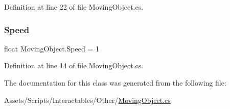 Definition at line 22 of file Moving\+Object.\+cs.

\mbox{\label{class_moving_object_a2430d5f8025716d6363ed0098f869604}} 
\subsubsection{\texorpdfstring{Speed}{Speed}}
{\footnotesize\ttfamily float Moving\+Object.\+Speed = 1}



Definition at line 14 of file Moving\+Object.\+cs.



The documentation for this class was generated from the following file\+:\begin{DoxyCompactItemize}
\item 
Assets/\+Scripts/\+Interactables/\+Other/\mbox{\hyperlink{_moving_object_8cs}{Moving\+Object.\+cs}}\end{DoxyCompactItemize}
